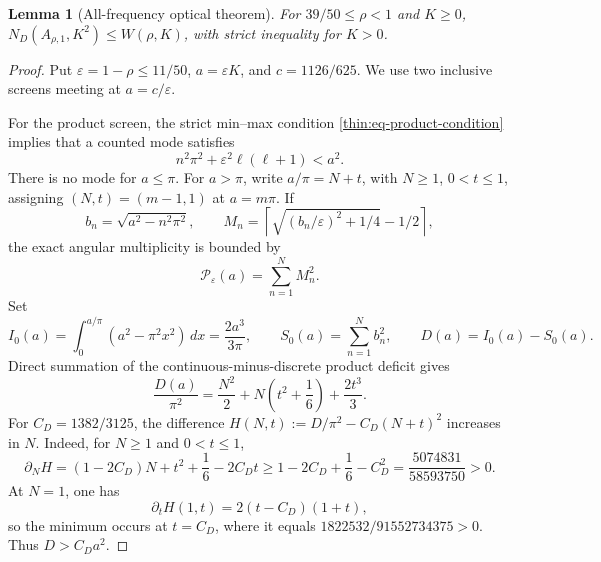 \documentclass[11pt]{article}
\numberwithin{equation}{section}
\newtheorem{lemma}[theorem]{Lemma}
\theoremstyle{definition}
\theoremstyle{remark}
\begin{document}
\begin{lemma}[All-frequency optical theorem]
\label{opt:lem-optical}
For \(39/50\leq\rho<1\) and \(K\geq0\),
\(N_D(A_{\rho,1},K^2)\leq W(\rho,K)\), with strict inequality for
\(K>0\).
\end{lemma}

\begin{proof}
Put \(\varepsilon=1-\rho\leq11/50\),
\(a=\varepsilon K\), and \(c=1126/625\).  We use two inclusive screens
meeting at \(a=c/\varepsilon\).

For the product screen, the strict min--max condition
\eqref{thin:eq-product-condition} implies that a counted mode satisfies
\[
 n^2\pi^2+\varepsilon^2\ell(\ell+1)<a^2.
\]
There is no mode for \(a\leq\pi\).  For \(a>\pi\), write
\(a/\pi=N+t\), with \(N\geq1\), \(0<t\leq1\), assigning
\((N,t)=(m-1,1)\) at \(a=m\pi\).  If
\[
 b_n=\sqrt{a^2-n^2\pi^2},\qquad
 M_n=\left\lceil\sqrt{(b_n/\varepsilon)^2+1/4}-1/2\right\rceil,
\]
the exact angular multiplicity is bounded by
\[
 \mathcal P_\varepsilon(a)=\sum_{n=1}^N M_n^2.
\]
Set
\[
 I_0(a)=\int_0^{a/\pi}(a^2-\pi^2x^2)\,dx
       =\frac{2a^3}{3\pi},
 \qquad
 S_0(a)=\sum_{n=1}^N b_n^2,
 \qquad D(a)=I_0(a)-S_0(a).
\]
Direct summation of the continuous-minus-discrete product deficit gives
\begin{equation}
 \frac{D(a)}{\pi^2}=\frac{N^2}{2}
 +N\left(t^2+\frac16\right)+\frac{2t^3}{3}.
 \label{opt:eq-product-deficit}
\end{equation}
For \(C_D=1382/3125\), the difference
\(H(N,t):=D/\pi^2-C_D(N+t)^2\) increases in \(N\).  Indeed, for
\(N\geq1\) and \(0<t\leq1\),
\[
 \partial_NH
 =(1-2C_D)N+t^2+\frac16-2C_Dt
 \geq1-2C_D+\frac16-C_D^2
 =\frac{5074831}{58593750}>0.
\]
At \(N=1\), one has
\[
 \partial_tH(1,t)=2(t-C_D)(1+t),
\]
so the minimum occurs at \(t=C_D\), where it equals
\(1822532/91552734375>0\).  Thus \(D>C_Da^2\).


\end{proof}
\end{document}
